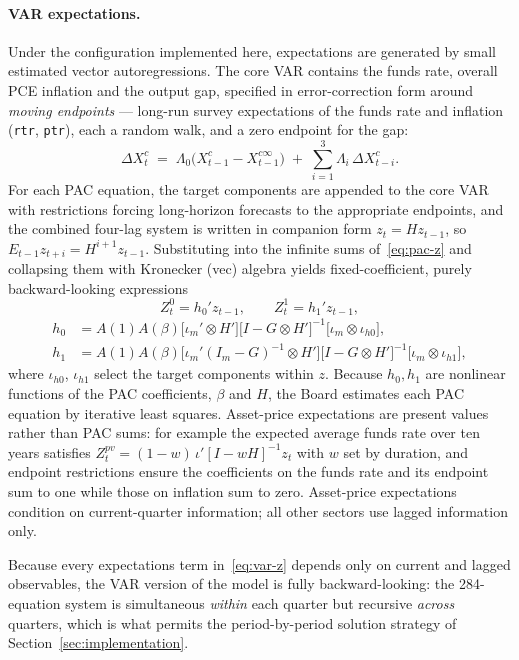 \paragraph{VAR expectations.} Under the configuration implemented here, expectations are generated by small estimated vector autoregressions. The core VAR contains the funds rate, overall PCE inflation and the output gap, specified in error-correction form around \emph{moving endpoints} --- long-run survey expectations of the funds rate and inflation (\texttt{rtr}, \texttt{ptr}), each a random walk, and a zero endpoint for the gap:
\begin{equation}
\Delta X^{c}_t \;=\; \Lambda_0\big(X^{c}_{t-1}-X^{c\infty}_{t-1}\big) \;+\; \sum_{i=1}^{3}\Lambda_i\,\Delta X^{c}_{t-i}.
\label{eq:core-var}
\end{equation}
For each PAC equation, the target components are appended to the core VAR with restrictions forcing long-horizon forecasts to the appropriate endpoints, and the combined four-lag system is written in companion form $z_t = H z_{t-1}$, so $E_{t-1}z_{t+i}=H^{i+1}z_{t-1}$. Substituting into the infinite sums of~\eqref{eq:pac-z} and collapsing them with Kronecker (vec) algebra yields fixed-coefficient, purely backward-looking expressions
\begin{equation}
Z^{0}_t = h_0' z_{t-1}, \qquad Z^{1}_t = h_1' z_{t-1},
\label{eq:var-z}
\end{equation}
\begin{align}
h_0 &= A(1)A(\beta)\big[\iota_m'\otimes H'\big]\big[I - G\otimes H'\big]^{-1}\big[\iota_m\otimes\iota_{h0}\big], \nonumber\\
h_1 &= A(1)A(\beta)\big[\iota_m'(I_m{-}G)^{-1}\otimes H'\big]\big[I - G\otimes H'\big]^{-1}\big[\iota_m\otimes\iota_{h1}\big],
\label{eq:var-h}
\end{align}
where $\iota_{h0}$, $\iota_{h1}$ select the target components within $z$. Because $h_0,h_1$ are nonlinear functions of the PAC coefficients, $\beta$ and $H$, the Board estimates each PAC equation by iterative least squares. Asset-price expectations are present values rather than PAC sums: for example the expected average funds rate over ten years satisfies $Z^{pv}_t=(1-w)\,\iota'[I-wH]^{-1}z_t$ with $w$ set by duration, and endpoint restrictions ensure the coefficients on the funds rate and its endpoint sum to one while those on inflation sum to zero. Asset-price expectations condition on current-quarter information; all other sectors use lagged information only.

Because every expectations term in~\eqref{eq:var-z} depends only on current and lagged observables, the VAR version of the model is fully backward-looking: the 284-equation system is simultaneous \emph{within} each quarter but recursive \emph{across} quarters, which is what permits the period-by-period solution strategy of Section~\ref{sec:implementation}.

